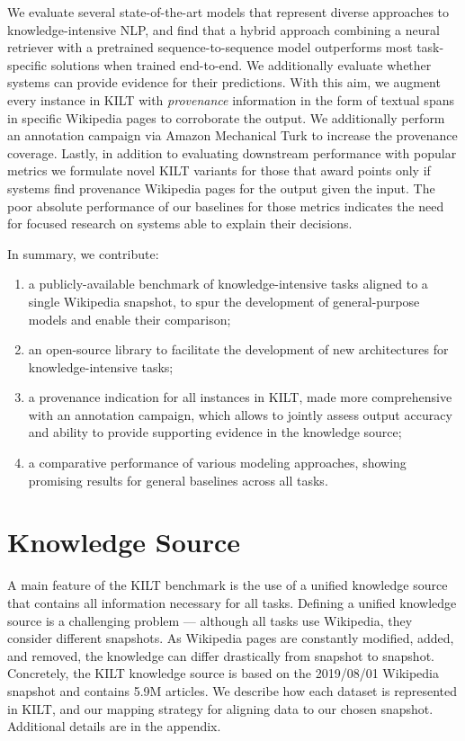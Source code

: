 \documentclass[11pt]{article}
\begin{document}
We evaluate several state-of-the-art models that represent diverse approaches to knowledge-intensive NLP, and find that a hybrid approach combining a neural retriever with a pretrained sequence-to-sequence model outperforms most task-specific solutions when trained end-to-end. We additionally evaluate whether systems can provide evidence for their predictions.
With this aim, we augment every instance in KILT with \textit{provenance} information in the form of textual spans in specific Wikipedia pages to corroborate the output. We additionally perform an annotation campaign via Amazon Mechanical Turk to increase the provenance coverage.
Lastly, in addition to evaluating downstream performance with popular metrics we formulate novel KILT variants for those that award points only if systems find provenance Wikipedia pages for the output given the input.
The poor absolute performance of our baselines for those metrics indicates the need for focused research on systems able to explain their decisions.



In summary, we contribute:
\vspace{-0.55em}
\begin{enumerate} \itemsep-0.45em 
\item a publicly-available benchmark of knowledge-intensive tasks aligned to a single Wikipedia snapshot, to spur the development of general-purpose models and enable their comparison;
\item an open-source library to facilitate the development of new architectures for knowledge-intensive tasks;
\item a provenance indication for all instances in KILT, made more comprehensive with an annotation campaign, which allows to jointly assess output accuracy and ability to provide supporting evidence in the knowledge source;
\item a comparative performance of various modeling approaches, showing promising results for general baselines across all tasks.
\end{enumerate}
 \section{Knowledge Source}



A main feature of the KILT benchmark is the use of a unified knowledge source that contains all information necessary for all tasks. Defining a unified knowledge source is a challenging problem --- although all tasks use Wikipedia, they consider different snapshots. As Wikipedia pages are constantly modified, added, and removed, the knowledge can differ drastically from snapshot to snapshot. 
Concretely, the KILT knowledge source is based on the 2019/08/01 Wikipedia snapshot and contains 5.9M articles. We describe how each dataset is represented in KILT, and our mapping strategy for aligning data to our chosen snapshot. Additional details are in the appendix.
\end{document}
